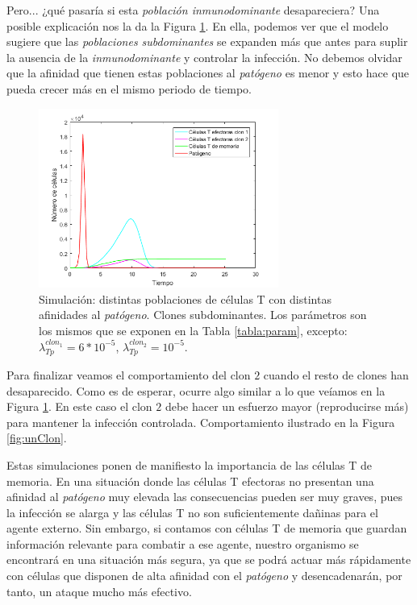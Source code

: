 Pero... ¿qué pasaría si esta \textit{población inmunodominante} desapareciera? Una posible explicación nos la da la Figura \ref{fig:dosClones}. En ella, podemos ver que el modelo sugiere que las \textit{poblaciones subdominantes} se expanden más que antes para suplir la ausencia de la \textit{inmunodominante} y controlar la infección. No debemos olvidar que la afinidad que tienen estas poblaciones al \textit{patógeno} es menor y esto hace que pueda crecer más en el mismo periodo de tiempo.


\begin{figure}[t]
	\centering
	\includegraphics[width=0.7\textwidth]{Imagenes/Simulaciones/dosClones}
	\caption{Simulación: distintas poblaciones de células T con distintas afinidades al \textit{patógeno}. Clones subdominantes. Los parámetros son los mismos que se exponen en la Tabla \ref{tabla:param}, excepto: $\lambda_{Tp}^{clon_1} = 6*10^{-5}$, $\lambda_{Tp}^{clon_2} = 10^{-5}$.}
	\label{fig:dosClones}
\end{figure}

Para finalizar veamos el comportamiento del clon $2$ cuando el resto de clones han desaparecido. Como es de esperar, ocurre algo similar a lo que veíamos en la Figura \ref{fig:dosClones}. En este caso el clon $2$ debe hacer un esfuerzo mayor (reproducirse más) para mantener la infección controlada. Comportamiento ilustrado en la Figura \ref{fig:unClon}.

Estas simulaciones ponen de manifiesto la importancia de las células T de memoria. En una situación donde las células T efectoras no presentan una afinidad al \textit{patógeno} muy elevada las consecuencias pueden ser muy graves, pues la infección se alarga y las células T no son suficientemente dañinas para el agente externo. Sin embargo, si contamos con células T de memoria que guardan información relevante para combatir a ese agente, nuestro organismo se encontrará en una situación más segura, ya que se podrá actuar más rápidamente con células que disponen de alta afinidad con el \textit{patógeno} y desencadenarán, por tanto, un ataque mucho más efectivo.

